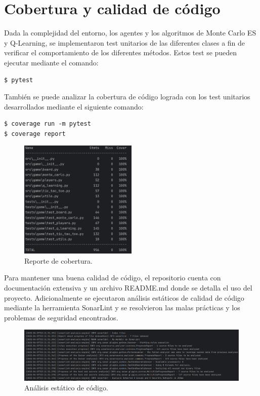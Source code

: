 
\chapter{Cobertura y calidad de código} %

\label{Cobertura y calidad de código}

Dada la complejidad del entorno, los agentes y los algoritmos de Monte Carlo ES y Q-Learning, se implementaron test unitarios de las diferentes clases a fin de verificar el comportamiento de los diferentes métodos. Estos test se pueden ejecutar mediante el comando:

\begin{verbatim}
$ pytest
\end{verbatim}

También se puede analizar la cobertura de código lograda con los test unitarios desarrollados mediante el siguiente comando:

\begin{verbatim}
$ coverage run -m pytest
$ coverage report
\end{verbatim}

\begin{figure}[htbp]
	\centering
	\includegraphics[width=0.5\textwidth]{./Figures/coverage.png}
	\caption{Reporte de cobertura.}
	\label{fig:coverage}
\end{figure}

Para mantener una buena calidad de código, el repositorio cuenta con documentación extensiva y un archivo README.md donde se detalla el uso del proyecto. Adicionalmente se ejecutaron análisis estáticos de calidad de código mediante la herramienta SonarLint y se resolvieron las malas prácticas y los problemas de seguridad encontrados.

\begin{figure}[htbp]
	\centering
	\includegraphics[width=\textwidth]{./Figures/sonar.png}
	\caption{Análisis estático de código.}
	\label{fig:sonar}
\end{figure}

